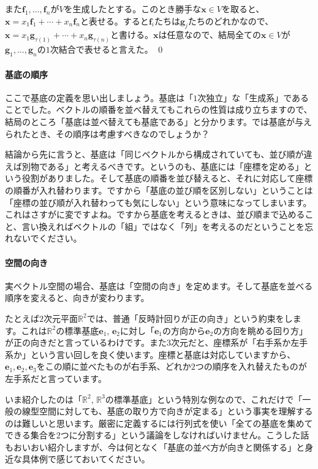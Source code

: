 また$\bm{f}_1, \ldots, \bm{f}_n$が$V$を生成したとする。このとき勝手な$\bm{x} \in V$を取ると、$\bm{x} = x_1 \bm{f}_1 + \cdots + x_n \bm{f}_n$と表せる。すると$\bm{f}_i$たちは$\bm{g}_j$たちのどれかなので、$\bm{x} = x_1 \bm{g}_{\tau(1)} + \cdots + x_n \bm{g}_{\tau(n)}$と書ける。$\bm{x}$は任意なので、結局全ての$\bm{x} \in V$が$\bm{g}_1, \ldots, \bm{g}_n$の$1$次結合で表せると言えた。 \qed

\paragraph{基底の順序}

ここで基底の定義を思い出しましょう。基底は「$1$次独立」な「生成系」であることでした。ベクトルの順番を並べ替えてもこれらの性質は成り立ちますので、結局のところ「基底は並べ替えても基底である」と分かります。では基底が与えられたとき、その順序は考慮すべきなのでしょうか？

結論から先に言うと、基底は「同じベクトルから構成されていても、並び順が違えば別物である」と考えるべきです。というのも、基底には「座標を定める」という役割がありました。そして基底の順番を並び替えると、それに対応して座標の順番が入れ替わります。ですから「基底の並び順を区別しない」ということは「座標の並び順が入れ替わっても気にしない」という意味になってしまいます。これはさすがに変ですよね。ですから基底を考えるときは、並び順まで込めること、言い換えればベクトルの「組」ではなく「列」を考えるのだということを忘れないでください。

\paragraph{空間の向き}
実ベクトル空間の場合、基底は「空間の向き」を定めます。そして基底を並べる順序を変えると、向きが変わります。

たとえば$2$次元平面$\mathbb{R}^2$では、普通「反時計回りが正の向き」という約束をします。これは$\mathbb{R}^2$の標準基底$\bm{e}_1$, $\bm{e}_2$に対し「$\bm{e}_1$の方向から$\bm{e}_2$の方向を眺める回り方」が正の向きだと言っているわけです。また$3$次元だと、座標系が「右手系か左手系か」という言い回しを良く使います。座標と基底は対応していますから、$\bm{e}_1, \bm{e}_2, \bm{e}_3$をこの順に並べたものが右手系、どれか$2$つの順序を入れ替えたものが左手系だと言っています。

いま紹介したのは「$\mathbb{R}^2$, $\mathbb{R}^3$の標準基底」という特別な例なので、これだけで「一般の線型空間に対しても、基底の取り方で向きが定まる」という事実を理解するのは難しいと思います。厳密に定義するには行列式を使い「全ての基底を集めてできる集合を$2$つに分割する」という議論をしなければいけません。こうした話もおいおい紹介しますが、今は何となく「基底の並べ方が向きと関係する」と身近な具体例で感じておいてください。

